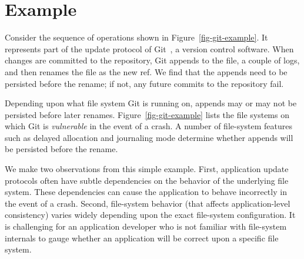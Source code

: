 \section{Example}
\label{sec-example}

Consider the sequence of operations shown in Figure~\ref{fig-git-example}. It
represents part of the update protocol of Git~\cite{git}, a version control
software. When changes are committed to the repository, Git appends to the
 file, a couple of logs, and then renames the
 file as the new  ref. We find that the
appends need to be persisted before the rename; if not, any future commits to
the repository fail. 

Depending upon what file system Git is running on, appends may or may not be
persisted before later renames. Figure~\ref{fig-git-example} lists the file
systems on which Git is \textit{vulnerable} in the event of a crash.  A number
of file-system features such as delayed allocation and journaling mode
determine whether appends will be persisted before the rename.  

We make two observations from this simple example. First, application update
protocols often have subtle dependencies on the behavior of the underlying file
system. These dependencies can cause the application to behave incorrectly in
the event of a crash. Second, file-system behavior (that affects
application-level consistency) varies widely depending upon the exact
file-system configuration. It is challenging for an application developer who
is not familiar with file-system internals to gauge whether an application will
be correct upon a specific file system.
